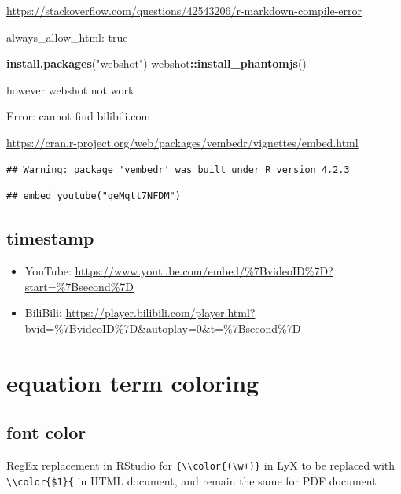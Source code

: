 \documentclass[
]{book}
\newenvironment{Shaded}{\begin{snugshade}}{\end{snugshade}}
\newcommand{\FunctionTok}[1]{\textcolor[rgb]{0.13,0.29,0.53}{\textbf{#1}}}
\newcommand{\NormalTok}[1]{#1}
\newcommand{\SpecialCharTok}[1]{\textcolor[rgb]{0.81,0.36,0.00}{\textbf{#1}}}
\newcommand{\StringTok}[1]{\textcolor[rgb]{0.31,0.60,0.02}{#1}}
\providecommand{\tightlist}{%
  \setlength{\itemsep}{0pt}\setlength{\parskip}{0pt}}
\theoremstyle{definition}
\theoremstyle{definition}
\theoremstyle{definition}
\theoremstyle{definition}
\theoremstyle{remark}
\begin{document}
\url{https://stackoverflow.com/questions/42543206/r-markdown-compile-error}

always\_allow\_html: true

\begin{Shaded}
\begin{Highlighting}[]
\FunctionTok{install.packages}\NormalTok{(}\StringTok{"webshot"}\NormalTok{)}
\NormalTok{webshot}\SpecialCharTok{::}\FunctionTok{install\_phantomjs}\NormalTok{()}
\end{Highlighting}
\end{Shaded}

however webshot not work

Error: cannot find bilibili.com

\url{https://cran.r-project.org/web/packages/vembedr/vignettes/embed.html}

\begin{verbatim}
## Warning: package 'vembedr' was built under R version 4.2.3
\end{verbatim}

\begin{verbatim}
## embed_youtube("qeMqtt7NFDM")
\end{verbatim}

\subsection{timestamp}\label{timestamp}

\begin{itemize}
\tightlist
\item
  YouTube: \url{https://www.youtube.com/embed/\%7BvideoID\%7D?start=\%7Bsecond\%7D}
\item
  BiliBili: \url{https://player.bilibili.com/player.html?bvid=\%7BvideoID\%7D&autoplay=0&t=\%7Bsecond\%7D}
\end{itemize}

\section{equation term coloring}\label{equation-term-coloring}

\subsection{font color}\label{font-color}

RegEx replacement in RStudio for \texttt{\{\textbackslash{}\textbackslash{}color\{(\textbackslash{}w+)\}} in LyX to be replaced with \texttt{\textbackslash{}\textbackslash{}color\{\$1\}\{} in HTML document, and remain the same for PDF document
\end{document}

